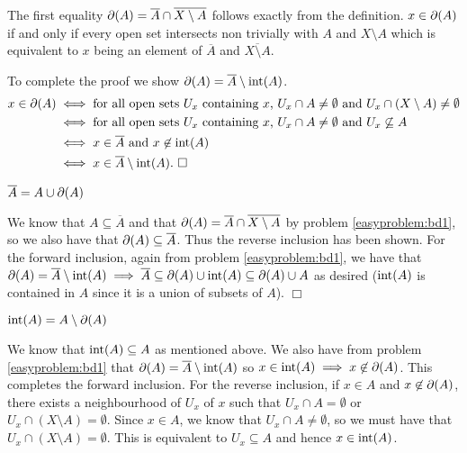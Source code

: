 \documentclass{article}
\begin{document}
 {
   The first equality $\partial(A)= \overline{A} \cap \overline{X\setminus A}$ follows exactly from the definition. $x\in \partial(A)$ if and only if every open set intersects non trivially with $A$ and $X\setminus A$ which is equivalent to $x$ being an element of $\overline{A}$ and $\overline{X\setminus A}$.

   To complete the proof we show $\partial(A) = \overline{A}\setminus \operatorname{int} (A)$. 
   \begin{align*}
    x\in \partial(A) &\iff \text{for all open sets $U_{x}$ containing $x$, }U_{x}\cap A\neq \emptyset\text{ and }U_{x}\cap (X\setminus A)\neq \emptyset\\
    &\iff \text{for all open sets $U_{x}$ containing $x$, }U_{x}\cap A\neq \emptyset\text{ and }U_{x}\not\subseteq A\\
    &\iff x\in \overline{A} \text{ and }x\not\in \operatorname{int}(A)\\
    &\iff x\in \overline{A}\setminus\operatorname{int}(A). \ \Box
   \end{align*}
}
 {
   \begin{spacedenumerate}
    \item $\overline{A} = A\cup\partial(A)$
    
    We know that $A\subseteq \overline{A}$ and that $\partial(A) = \overline{A}\cap \overline{X\setminus A}$ by problem \ref{easyproblem:bd1}, so we also have that $\partial(A)\subseteq \overline{A}$. Thus the reverse inclusion has been shown. For the forward inclusion, again from problem \ref{easyproblem:bd1}, we have that $\partial(A) = \overline{A}\setminus \operatorname{int}(A)\implies \overline{A} \subseteq \partial(A)\cup \operatorname{int}(A)\subseteq \partial(A)\cup A$ as desired ($\operatorname{int}(A)$ is contained in $A$ since it is a union of subsets of $A$). $\Box$ 
    \item $\operatorname{int}(A) = A\setminus \partial(A)$
    
    We know that $\operatorname{int}(A)\subseteq A$ as mentioned above. We also have from problem \ref{easyproblem:bd1} that $\partial (A) = \overline{A} \setminus \operatorname{int}(A)$ so $x\in \operatorname{int}(A)\implies x\not\in \partial(A)$. This completes the forward inclusion. For the reverse inclusion, if $x\in A$ and $x\not\in \partial(A)$, there exists a neighbourhood of $U_{x}$ of $x$ such that $U_{x}\cap A = \emptyset$ or $U_{x}\cap(X\setminus A) = \emptyset$. Since $x\in A$, we know that $U_{x}\cap A\neq \emptyset$, so we must have that $U_{x}\cap(X\setminus A) = \emptyset$. This is equivalent to $U_{x}\subseteq A$ and hence $x\in \operatorname{int}(A)$.
   \end{spacedenumerate}
}
\end{document}
